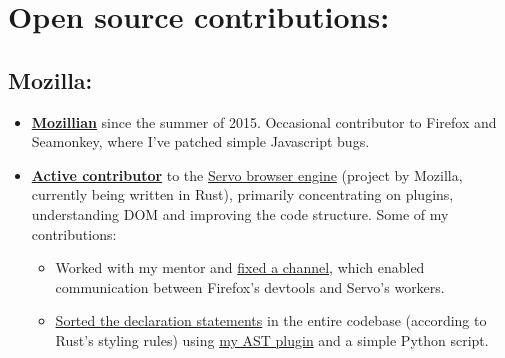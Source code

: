 \documentclass[11pt,a4paper,sans]{moderncv}        %
\newcommand\chref[3][linky]{\href{#2}{\color{#1}#3}}
\begin{document}
\makecvtitle



\section{Open source contributions:}
\subsection*{Mozilla:}
\begin{itemize}
\item \textbf{\chref{https://mozillians.org/en-US/u/wafflespeanut/}{Mozillian}} since the summer of 2015. Occasional contributor to Firefox and Seamonkey, where I've patched simple Javascript bugs.
\item \textbf{\chref{http://servostat.youknowone.org/}{Active contributor}} to the \chref{https://github.com/servo/servo}{Servo browser engine} (project by Mozilla, currently being written in Rust), primarily concentrating on plugins, understanding DOM and improving the code structure. Some of my contributions:
    \begin{itemize}
    \item Worked with my mentor and \chref{https://github.com/servo/servo/pull/6829}{fixed a channel}, which enabled communication between Firefox's devtools and Servo's workers.
    \item \chref{https://github.com/servo/servo/pull/7698}{Sorted the declaration statements} in the entire codebase (according to Rust's styling rules) using \chref{https://github.com/Wafflespeanut/rust-sorty}{my AST plugin} and a simple Python script.
    \end{itemize}
\end{itemize}
\end{document}
